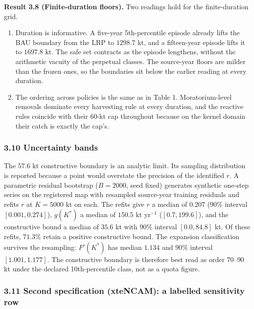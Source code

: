 \documentclass[11pt]{article}
\begin{document}
\textbf{Result 3.8 (Finite-duration floors).} Two readings hold for the
finite-duration grid.

\begin{enumerate}
\def\labelenumi{(\roman{enumi})}
\item
  Duration is informative. A five-year 5th-percentile episode already
  lifts the BAU boundary from the LRP to \(1298.7\) kt, and a
  fifteen-year episode lifts it to \(1697.8\) kt. The safe set contracts
  as the episode lengthens, without the arithmetic vacuity of the
  perpetual classes. The source-year floors are milder than the frozen
  ones, so the boundaries sit below the earlier reading at every
  duration.
\item
  The ordering across policies is the same as in Table 1.
  Moratorium-level removals dominate every harvesting rule at every
  duration, and the reactive rules coincide with their 60-kt cap
  throughout because on the kernel domain their catch is exactly the
  cap's.
\end{enumerate}

\subsubsection{3.10 Uncertainty bands}\label{uncertainty-bands}

The \(57.6\) kt constructive boundary is an analytic limit. Its sampling
distribution is reported because a point would overstate the precision
of the identified \(r\). A parametric residual bootstrap (\(B = 2000\),
seed fixed) generates synthetic one-step series on the registered map
with resampled source-year training residuals and refits \(r\) at
\(K = 5000\) kt on each. The refits give \(r\) a median of \(0.207\)
(\(90\%\) interval \([0.001, 0.274]\)), \(g(K^*)\) a median of \(150.5\)
kt yr\(^{-1}\) (\([0.7, 199.6]\)), and the constructive bound a median
of \(35.6\) kt with \(90\%\) interval \([0.0, 84.8]\) kt. Of these
refits, \(71.3\%\) retain a positive constructive bound. The expansion
classification survives the resampling: \(F'(K^*)\) has median \(1.134\)
and \(90\%\) interval \([1.001, 1.177]\). The constructive boundary is
therefore best read as order \(70\)--\(90\) kt under the declared
10th-percentile class, not as a quota figure.

\subsubsection{3.11 Second specification (xteNCAM): a labelled
sensitivity
row}\label{second-specification-xtencam-a-labelled-sensitivity-row}
\end{document}
